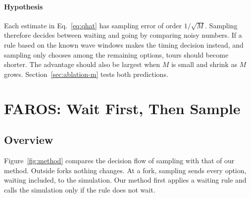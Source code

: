 \documentclass[5p,times,authoryear]{elsarticle}
\begin{document}
\paragraph{Hypothesis}
Each estimate in Eq.~\eqref{eq:qhat} has sampling error of order $1/\sqrt{M}$. Sampling therefore decides between waiting and going by comparing noisy numbers. If a rule based on the known wave windows makes the timing decision instead, and sampling only chooses among the remaining options, tours should become shorter. The advantage should also be largest when $M$ is small and shrink as $M$ grows. Section~\ref{sec:ablation-m} tests both predictions.

\section{FAROS: Wait First, Then Sample}
\label{sec:method}

\subsection{Overview}

Figure~\ref{fig:method} compares the decision flow of sampling with that of our method. Outside forks nothing changes. At a fork, sampling sends every option, waiting included, to the simulation. Our method first applies a waiting rule and calls the simulation only if the rule does not wait.
\end{document}
